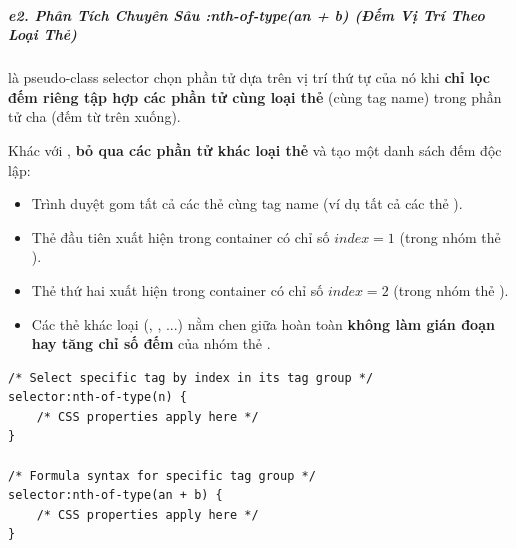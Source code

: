
\subparagraph{e2. Phân Tích Chuyên Sâu :nth-of-type(an + b) (Đếm Vị Trí Theo Loại Thẻ)}

 là pseudo-class selector chọn phần tử dựa trên vị trí thứ tự của nó khi \textbf{chỉ lọc đếm riêng tập hợp các phần tử cùng loại thẻ} (cùng tag name) trong phần tử cha (đếm từ trên xuống).

\begin{conceptBox}
Khác với ,  \textbf{bỏ qua các phần tử khác loại thẻ} và tạo một danh sách đếm độc lập:
\begin{itemize}[leftmargin=1.5em, itemsep=2pt, parsep=0pt]
    \item Trình duyệt gom tất cả các thẻ cùng tag name (ví dụ tất cả các thẻ ).
    \item Thẻ  đầu tiên xuất hiện trong container có chỉ số $index = 1$ (trong nhóm thẻ ).
    \item Thẻ  thứ hai xuất hiện trong container có chỉ số $index = 2$ (trong nhóm thẻ ).
    \item Các thẻ khác loại (, , ...) nằm chen giữa hoàn toàn \textbf{không làm gián đoạn hay tăng chỉ số đếm} của nhóm thẻ .
\end{itemize}
\end{conceptBox}

\begin{codeWindow}
\begin{lstlisting}[language=CSS3]
/* Select specific tag by index in its tag group */
selector:nth-of-type(n) {
    /* CSS properties apply here */
}

/* Formula syntax for specific tag group */
selector:nth-of-type(an + b) {
    /* CSS properties apply here */
}
\end{lstlisting}
\end{codeWindow}

